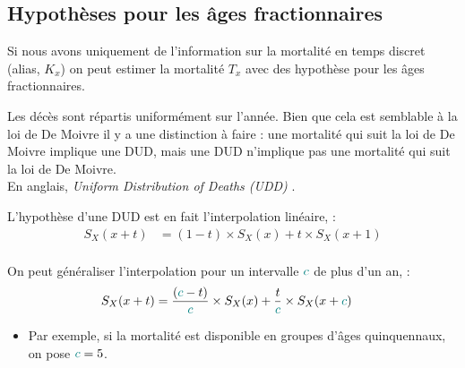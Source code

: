 \documentclass[10pt, french]{article}
\begin{document}
\begin{multicols*}{3}
\columnbreak
\subsection{Hypothèses pour les âges fractionnaires}
\begin{rappel_enhanced}[Contexte]
Si nous avons uniquement de l'information sur la mortalité en temps discret (alias, $K_{x}$) on peut estimer la mortalité $T_x$ avec des hypothèse pour les âges fractionnaires.
\end{rappel_enhanced}


\begin{definitionNOHFILL}
\begin{rappel_enhanced}[Contexte]
Les décès sont répartis uniformément sur l'année. Bien que cela est semblable à la loi de De Moivre il y a une distinction à faire : une mortalité qui suit la loi de De Moivre implique une DUD, mais une DUD n'implique pas une mortalité qui suit la loi de De Moivre.\\

En anglais, \og \textit{Uniform Distribution of Deaths (UDD)} \fg{}.
\end{rappel_enhanced}

\bigskip

L'hypothèse d'une DUD est en fait l'interpolation linéaire, :
\begin{align*}
	S_{X}(x + t) 
	&=	(1 - t) \times S_X(x) + t \times S_X(x + 1)	\\
\end{align*}

On peut généraliser l'interpolation pour un intervalle $\textcolor{teal}{c}$ de plus d'un an,  :
\begin{align*}
	S_{X}(x + t) 
	&=	\frac{(\textcolor{teal}{c} - t)}{\textcolor{teal}{c}} \times S_X(x) + \frac{t}{\textcolor{teal}{c}} \times S_X(x + \textcolor{teal}{c})	
\end{align*}
\begin{itemize}
	\item	Par exemple, si la mortalité est disponible en groupes d'âges quinquennaux, on pose $\textcolor{teal}{c} = 5$.
\end{itemize}
\end{definitionNOHFILL}



\end{multicols*}
\end{document}

